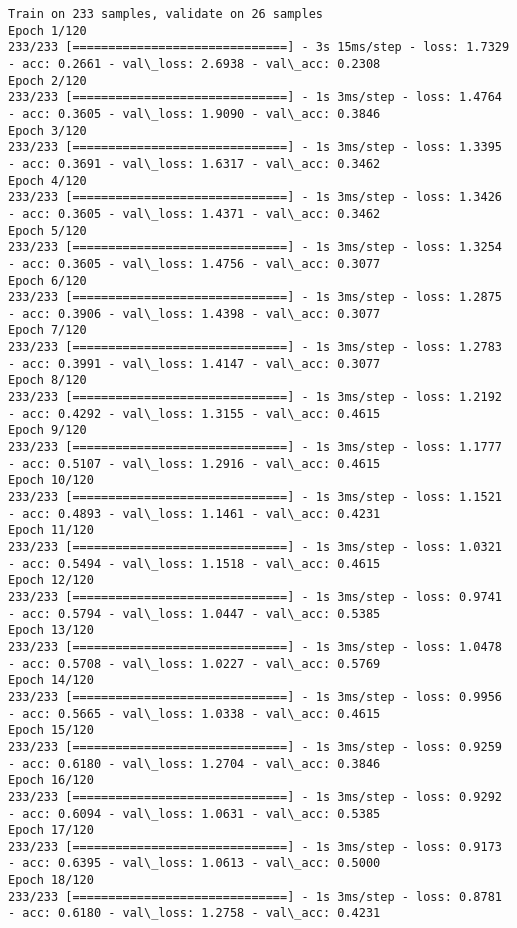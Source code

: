 \documentclass[11pt]{article}
\begin{document}
    \begin{Verbatim}[commandchars=\\\{\}]
Train on 233 samples, validate on 26 samples
Epoch 1/120
233/233 [==============================] - 3s 15ms/step - loss: 1.7329 - acc: 0.2661 - val\_loss: 2.6938 - val\_acc: 0.2308
Epoch 2/120
233/233 [==============================] - 1s 3ms/step - loss: 1.4764 - acc: 0.3605 - val\_loss: 1.9090 - val\_acc: 0.3846
Epoch 3/120
233/233 [==============================] - 1s 3ms/step - loss: 1.3395 - acc: 0.3691 - val\_loss: 1.6317 - val\_acc: 0.3462
Epoch 4/120
233/233 [==============================] - 1s 3ms/step - loss: 1.3426 - acc: 0.3605 - val\_loss: 1.4371 - val\_acc: 0.3462
Epoch 5/120
233/233 [==============================] - 1s 3ms/step - loss: 1.3254 - acc: 0.3605 - val\_loss: 1.4756 - val\_acc: 0.3077
Epoch 6/120
233/233 [==============================] - 1s 3ms/step - loss: 1.2875 - acc: 0.3906 - val\_loss: 1.4398 - val\_acc: 0.3077
Epoch 7/120
233/233 [==============================] - 1s 3ms/step - loss: 1.2783 - acc: 0.3991 - val\_loss: 1.4147 - val\_acc: 0.3077
Epoch 8/120
233/233 [==============================] - 1s 3ms/step - loss: 1.2192 - acc: 0.4292 - val\_loss: 1.3155 - val\_acc: 0.4615
Epoch 9/120
233/233 [==============================] - 1s 3ms/step - loss: 1.1777 - acc: 0.5107 - val\_loss: 1.2916 - val\_acc: 0.4615
Epoch 10/120
233/233 [==============================] - 1s 3ms/step - loss: 1.1521 - acc: 0.4893 - val\_loss: 1.1461 - val\_acc: 0.4231
Epoch 11/120
233/233 [==============================] - 1s 3ms/step - loss: 1.0321 - acc: 0.5494 - val\_loss: 1.1518 - val\_acc: 0.4615
Epoch 12/120
233/233 [==============================] - 1s 3ms/step - loss: 0.9741 - acc: 0.5794 - val\_loss: 1.0447 - val\_acc: 0.5385
Epoch 13/120
233/233 [==============================] - 1s 3ms/step - loss: 1.0478 - acc: 0.5708 - val\_loss: 1.0227 - val\_acc: 0.5769
Epoch 14/120
233/233 [==============================] - 1s 3ms/step - loss: 0.9956 - acc: 0.5665 - val\_loss: 1.0338 - val\_acc: 0.4615
Epoch 15/120
233/233 [==============================] - 1s 3ms/step - loss: 0.9259 - acc: 0.6180 - val\_loss: 1.2704 - val\_acc: 0.3846
Epoch 16/120
233/233 [==============================] - 1s 3ms/step - loss: 0.9292 - acc: 0.6094 - val\_loss: 1.0631 - val\_acc: 0.5385
Epoch 17/120
233/233 [==============================] - 1s 3ms/step - loss: 0.9173 - acc: 0.6395 - val\_loss: 1.0613 - val\_acc: 0.5000
Epoch 18/120
233/233 [==============================] - 1s 3ms/step - loss: 0.8781 - acc: 0.6180 - val\_loss: 1.2758 - val\_acc: 0.4231

\end{Verbatim}
\end{document}
